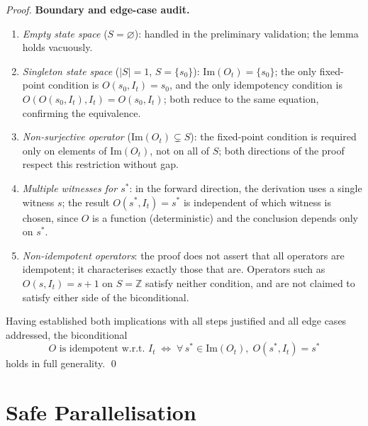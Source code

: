 \documentclass[12pt,openany]{book}
\newcommand{\calI}{\mathcal{I}}
\numberwithin{equation}{chapter}
\theoremstyle{plain}
\theoremstyle{definition}
\theoremstyle{remark}
\numberwithin{equation}{chapter}
\theoremstyle{plain}
\newcommand{\calS}{\mathcal{S}}
\def\calI{I}%
\def\calS{S}%
\begin{document}
\begin{proof}
\medskip
\noindent\textbf{Boundary and edge-case audit.}
\begin{enumerate}
  \item \emph{Empty state space} ($\calS = \varnothing$):
        handled in the preliminary validation; the lemma holds
        vacuously.
  \item \emph{Singleton state space} ($|\calS| = 1$, $\calS =
        \{s_0\}$): $\mathrm{Im}(O_t) = \{s_0\}$; the only fixed-point
        condition is $O(s_0,\calI_t) = s_0$, and the only idempotency
        condition is $O(O(s_0,\calI_t),\calI_t) = O(s_0,\calI_t)$;
        both reduce to the same equation, confirming the equivalence.
  \item \emph{Non-surjective operator} ($\mathrm{Im}(O_t) \subsetneq
        \calS$): the fixed-point condition is required only on elements
        of $\mathrm{Im}(O_t)$, not on all of $\calS$; both directions
        of the proof respect this restriction without gap.
  \item \emph{Multiple witnesses for $s^*$}: in the forward direction,
        the derivation uses a single witness $s$; the result $O(s^*,
        \calI_t) = s^*$ is independent of which witness is chosen,
        since $O$ is a function (deterministic) and the conclusion
        depends only on $s^*$.
  \item \emph{Non-idempotent operators}: the proof does not assert that
        all operators are idempotent; it characterises exactly those
        that are.  Operators such as $O(s,\calI_t) = s + 1$ on $\calS
        = \mathbb{Z}$ satisfy neither condition, and are not claimed to
        satisfy either side of the biconditional.
\end{enumerate}

\medskip
\noindent Having established both implications with all steps
justified and all edge cases addressed, the biconditional
\[
  O \text{ is idempotent w.r.t.\ } \calI_t
  \;\iff\;
  \forall\, s^* \in \mathrm{Im}(O_t),\; O(s^*,\calI_t) = s^*
\]
holds in full generality.
\qed
\end{proof}

\section{Safe Parallelisation}
\label{sec:safe-parallel}
\end{document}
